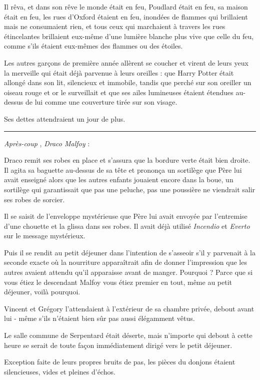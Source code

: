 Il rêva, et dans son rêve le monde était en feu, Poudlard était en feu, sa maison était en feu, les rues d'Oxford étaient en feu, inondées de flammes qui brillaient mais ne consumaient rien, et tous ceux qui marchaient à travers les rues étincelantes brillaient eux-même d'une lumière blanche plus vive que celle du feu, comme s'ils étaient eux-mêmes des flammes ou des étoiles.

Les autres garçons de première année allèrent se coucher et virent de leurs yeux la merveille qui était déjà parvenue à leurs oreilles : que Harry Potter était allongé dans son lit, silencieux et immobile, tandis que perché sur son oreiller un oiseau rouge et or le surveillait et que ses ailes lumineuses étaient étendues au-dessus de lui comme une couverture tirée sur son visage.

Ses dettes attendraient un jour de plus.
\par\noindent\rule{\textwidth}{0.4pt}
\emph{Après-coup} , \emph{Draco Malfoy}  :

Draco remit ses robes en place et s'assura que la bordure verte était bien droite. Il agita sa baguette au-dessus de sa tête et prononça un sortilège que Père lui avait enseigné alors que les autres enfants jouaient encore dans la boue, un sortilège qui garantissait que pas une peluche, pas une poussière ne viendrait salir ses robes de sorcier.

Il se saisit de l'enveloppe mystérieuse que Père lui avait envoyée par l'entremise d'une chouette et la glissa dans ses robes. Il avait déjà utilisé \emph{Incendio}  et \emph{Everto}  sur le message mystérieux.

Puis il se rendit au petit déjeuner dans l'intention de s'asseoir s'il y parvenait à la seconde exacte où la nourriture apparaîtrait afin de donner l'impression que les autres avaient attendu qu'il apparaisse avant de manger. Pourquoi ? Parce que si vous étiez le descendant Malfoy vous étiez premier en tout, même au petit déjeuner, voilà pourquoi.

Vincent et Grégory l'attendaient à l'extérieur de sa chambre privée, debout avant lui - même s'ils n'étaient bien sûr pas aussi élégamment vêtus.

Le salle commune de Serpentard était déserte, mais n'importe qui debout à cette heure se serait de toute façon immédiatement dirigé vers le petit déjeuner.

Exception faite de leurs propres bruits de pas, les pièces du donjons étaient silencieuses, vides et pleines d'échos.

